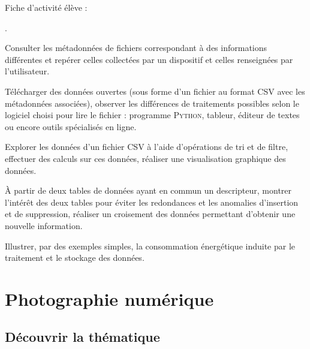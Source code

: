 \noindent Fiche d'activité élève :
\begin{jazzitemize}
\item {}.
\end{jazzitemize}


\begin{tcolorbox}[title={Ce que propose le programme}, toprule=0pt, leftrule=0pt, rightrule=0pt, arc=0pt,
                  fonttitle=\scshape\boxtitlefont,
                  colbacktitle=white, coltitle=firstcolor, colframe=firstcolor, colback=firstcolor!10,
                  breakable, enhanced jigsaw]
\begin{jazzitemize}
\item Consulter les métadonnées de fichiers correspondant à des informations différentes et repérer celles collectées par un dispositif et celles renseignées par l’utilisateur.   
\item Télécharger des données ouvertes (sous forme d’un fichier au format CSV avec les métadonnées associées), observer les différences de traitements possibles selon le logiciel choisi pour lire le fichier : programme \textsc{Python}, tableur, éditeur de textes ou encore outils spécialisés en ligne. 
\item Explorer les données d’un fichier CSV à l’aide d’opérations de tri et de filtre, effectuer des calculs sur ces données, réaliser une visualisation graphique des données.  
\item À partir de deux tables de données ayant en commun un descripteur, montrer l’intérêt des deux tables pour éviter les redondances et les anomalies d’insertion et de suppression, réaliser un  croisement des données permettant d’obtenir une nouvelle information.   
\item Illustrer, par des exemples simples, la consommation énergétique induite par le traitement et le stockage des données.
\end{jazzitemize}
\end{tcolorbox}


\section[Photographie numérique]{Photographie numérique}
\label{sec:VIII.2}


\subsection[Découvrir la thématique]{Découvrir la thématique}
\label{sub:VIII.2.1}



